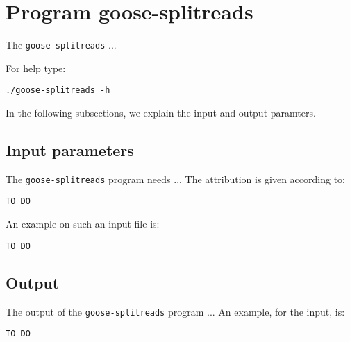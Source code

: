 \section{Program goose-splitreads}
The \texttt{goose-splitreads} ...

For help type:
\begin{lstlisting}
./goose-splitreads -h
\end{lstlisting}
In the following subsections, we explain the input and output paramters.

\subsection{Input parameters}

The \texttt{goose-splitreads} program needs ...
The attribution is given according to:
\begin{lstlisting}
TO DO
\end{lstlisting}

An example on such an input file is:
\begin{lstlisting}
TO DO
\end{lstlisting}

\subsection{Output}
The output of the \texttt{goose-splitreads} program ...
An example, for the input, is:
\begin{lstlisting}
TO DO
\end{lstlisting}
